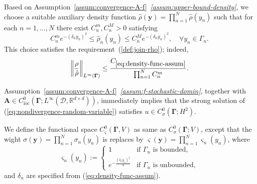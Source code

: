 \documentclass[final,onefignum,onetabnum]{mousaviart}
\begin{document}
	\vspace*{1mm}
	\begin{remark}
		Based on Assumption~\ref{assum:convergence-A-f}~\textit{\ref{assum:upper-bound-density}}, we choose a suitable auxiliary density function $\hat{\rho}(\boldsymbol{y})= \prod_{n=1}^N \hat{\rho}(y_n)$ such that for each $n= 1, \dots,N$ there exist $C^{m}_n, C^{M}_n>0$ satisfying
		\begin{equation}
			\label{ineq:auxiliary-density}
			C^{m}_n e^{-(\delta_ny_n)^2}
			\leq
			\hat{\rho}_n(y_n)
			\leq
			C^{M}_n e^{-(\delta_ny_n)^2}, 
			\quad
			\forall
			y_n \in \Gamma_n.
		\end{equation}
		This choice satisfies the requirement~(\ref{def:join-rho}); indeed, 
		\begin{equation}
			\label{ineq:upper-bound-rho-on-hat}	
		\left\| \dfrac{\rho}{\hat{\rho}}\right\| _{L^\infty(\boldsymbol{\Gamma})} \leq \dfrac{C_{\ref{eq:density-func-assum}}}{\prod_{n=1}^{N} C^{m}_n}.
		\end{equation}
	\end{remark}
	
	\vspace*{1mm}
	\begin{remark}
		\label{rem:regularity-w.r-paramter}
		Assumption~\ref{assum:convergence-A-f}~\textit{\ref{assum:f-stochastic-domin}}, together with $\boldsymbol{A} \in C^0_{\text{loc}}\left( \boldsymbol{\Gamma} ; L^{\infty}(\mathcal{D}, \mathbb{R}^{d \times d}) \right) $, immediately implies that the strong solution of (\ref{eq:nondivergence-random-variable}) satisfies $u \in C_\sigma^0( \boldsymbol{\Gamma}; H^2) $.
	\end{remark}
	
	\vspace*{1mm}
	\begin{definition}
		\label{def:space-versigma}
		We define the functional space $C_{\varsigma}^0\left( \boldsymbol{\Gamma}, V \right) $ as same as $C_\sigma^0(\boldsymbol{\Gamma}; V)$, except that 
		the wight $\sigma(\boldsymbol{y}) = \prod _{n=1}^N \sigma_n(y_n)$ is replaces by $\varsigma(\boldsymbol{y}) = \prod_{n=1}^{N}\varsigma_n(y_n)$, where 
		\begin{equation}
			\label{eq:varsigma-weight}
			\varsigma_n(y_n):=
			\begin{cases}
				1 & \text{if $\Gamma_n$ is bounded},
				\\
				e^{-\frac{(\delta_ny_n)^2}{4}} 
				& \text{if $\Gamma_n$ is unbounded},
			\end{cases}	
		\end{equation}
		and $\delta_n$ are specified from (\ref{eq:density-func-assum}).
	\end{definition}
	
\end{document}
